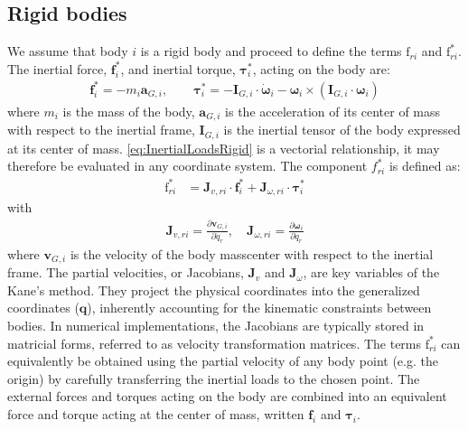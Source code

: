\documentclass[wes, manuscript]{copernicus}
\renewcommand{\v}[1]{\boldsymbol{#1}}
\newcommand{\m}[1]{\boldsymbol{#1}}
\newcommand{\kanef}{\mathrm{f}}
\begin{document}
\subsection{Rigid bodies}
\label{sec:rigidbodies}
We assume that body $i$ is a rigid body and proceed to define the terms $\kanef_{ri}$ and $\kanef_{ri}^*$.
The inertial force, $\v{f}_i^*$, and inertial torque, $\v{\tau}_i^*$, acting on the body are:
\begin{align}
     \v{f}_i^* = - m_i \v{a}_{G,i},
         \qquad
     \v{\tau}_i^* = -\m{I}_{G,i} \cdot \v{\dot{\omega}}_i - \v{\omega} _i \times( \m{I}_{G,i}\cdot \v{\omega}_i)
      \label{eq:InertialLoadsRigid}
\end{align}
where $m_i$ is the mass of the body, $\v{a}_{G,i}$ is the acceleration of its center of mass with respect to the inertial frame, $\m{I}_{G,i}$ is the inertial tensor of the body expressed at its center of mass. 
\autoref{eq:InertialLoadsRigid} is a vectorial relationship, it may therefore be evaluated in any coordinate system. 
The component $f_{ri}^*$ is defined as:
\begin{align}
   \kanef_{ri}^* &= \v{J}_{v,ri} \cdot \v{f}_i^*  + \v{J}_{\omega,ri} \cdot \v{\tau}_i^*
    \label{eq:frstarRigid}
\end{align}
with
\begin{align}
    \v{J}_{v,ri} = \frac{\partial \v{v}_{G,i}}{\partial \dot{q}_r}
    ,\quad
    \v{J}_{\omega,ri} = \frac{\partial \v{\omega}_{i}}{\partial \dot{q}_r}
\end{align}
where $\v{v}_{G,i}$ is the velocity of the body masscenter with respect to the inertial frame.
The partial velocities, or Jacobians, $\v{J}_v$ and $\v{J}_\omega$, are key variables of the Kane's method. They project the physical coordinates into the generalized coordinates ($\v{q}$), inherently accounting for the kinematic constraints between bodies. In numerical implementations, the Jacobians are typically stored in matricial forms, referred to as velocity transformation matrices.
The terms $\kanef_{ri}^*$ can equivalently be obtained using the partial velocity of any body point (e.g. the origin) by carefully transferring the inertial loads to the chosen point.
The external forces and torques acting on the body are combined into an equivalent force and torque acting at the center of mass, written $\v{f}_i$  and $\v{\tau}_i$. 
\end{document}
